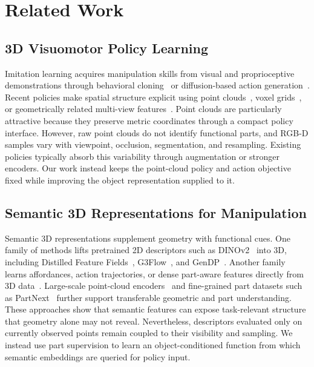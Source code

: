 \section{Related Work}

\subsection{3D Visuomotor Policy Learning}

Imitation learning acquires manipulation skills from visual and proprioceptive demonstrations through behavioral cloning~\cite{florence2022implicit,zhao2023learning} or diffusion-based action generation~\cite{chi2025diffusion}. Recent policies make spatial structure explicit using point clouds~\cite{ze20243d,ke20243d}, voxel grids~\cite{shridhar2023perceiver}, or geometrically related multi-view features~\cite{goyal2023rvt}. Point clouds are particularly attractive because they preserve metric coordinates through a compact policy interface. However, raw point clouds do not identify functional parts, and RGB-D samples vary with viewpoint, occlusion, segmentation, and resampling. Existing policies typically absorb this variability through augmentation or stronger encoders. Our work instead keeps the point-cloud policy and action objective fixed while improving the object representation supplied to it.

\subsection{Semantic 3D Representations for Manipulation}

Semantic 3D representations supplement geometry with functional cues. One family of methods lifts pretrained 2D descriptors such as DINOv2~\cite{oquab2023dinov2} into 3D, including Distilled Feature Fields~\cite{shen2023distilled}, G3Flow~\cite{chen2025g3flow}, and GenDP~\cite{wang2024gendp}. Another family learns affordances, action trajectories, or dense part-aware features directly from 3D data~\cite{mo2021where2act,wu2021vat,chen2026learning,xu2026action}. Large-scale point-cloud encoders~\cite{xie2020pointcontrast,zhang2026utonia} and fine-grained part datasets such as PartNext~\cite{wang2026partnext} further support transferable geometric and part understanding. These approaches show that semantic features can expose task-relevant structure that geometry alone may not reveal. Nevertheless, descriptors evaluated only on currently observed points remain coupled to their visibility and sampling. We instead use part supervision to learn an object-conditioned function from which semantic embeddings are queried for policy input.


